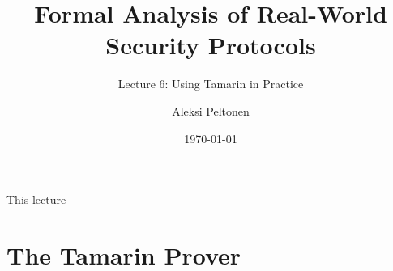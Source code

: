 \documentclass[11pt,aspectratio=169]{beamer}
\title{Formal Analysis of Real-World Security Protocols}
\subtitle{Lecture 6: Using Tamarin in Practice}
\date{\today}
\author{Aleksi Peltonen}
\institute{CISPA Helmholtz Center for Information Security}
\begin{document}
\maketitle


\begin{frame}[fragile]{This lecture}
    \tableofcontents
\end{frame}


\section{The Tamarin Prover}

\end{document}
